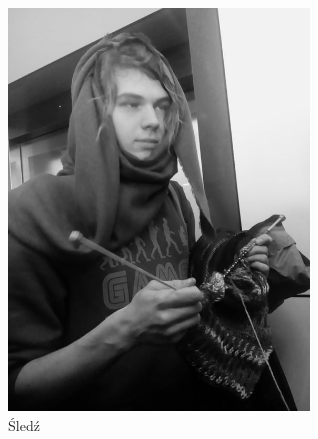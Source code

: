 \newpage
\begin{center}
\includegraphics[width=8cm]{Sledz.jpg}\\
\vspace{1cm}
\Large{Śledź}
\end{center}